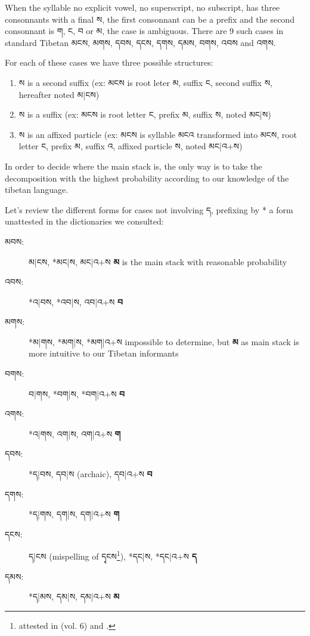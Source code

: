 \documentclass[%
a4paper,%
pagesize,%
12pt,%
parskip=off,%
bibliography=totoc,%
numbers=noenddot,%
DIV=12,%
twoside=semi,%
headings=normal%
]{scrartcl}
\begin{document}
When the syllable no explicit vowel, no superscript, no subscript, has three consonnants with a final ས, the first consonnant can be a prefix and the second consonnant is ག, ང, བ or མ, the case is ambiguous. There are 9 such cases in standard Tibetan མངས, མགས, དབས, དངས, དགས, དམས, བགས, འབས and འགས.

For each of these cases we have three possible structures:
\begin{enumerate}
\item ས is a second suffix (ex: མངས is root leter མ, suffix ང, second suffix ས, hereafter noted མ|ངས)
\item ས is a suffix (ex: མངས is root letter ང, prefix མ, suffix ས, noted མང|ས)
\item ས is an affixed particle (ex: མངས is syllable མངའ transformed into མངས, root letter ང, prefix མ, suffix འ, affixed particle ས, noted མང|འ+ས)
\end{enumerate}

In order to decide where the main stack is, the only way is to take the decomposition with the highest probability according to our knowledge of the tibetan language.

Let's review the different forms for cases not involving ད, prefixing by * a form unattested in the dictionaries we consulted:

\begin{description}
\item[མབས:] མ|ངས, *མང|ས, མང|འ+ས \rightarrow{} \textbf{མ} is the main stack with reasonable probability
\item[འབས:] *འ|བས, *འབ|ས, འབ|འ+ས \rightarrow{} \textbf{བ}
\item[མགས:] *མ|གས, *མག|ས, *མག|འ+ས \rightarrow{} impossible to determine, but \textbf{མ} as main stack is more intuitive to our Tibetan informants
\item[བགས:] བ|གས, *བག|ས, *བག|འ+ས \rightarrow{} \textbf{བ}
\item[འགས:] *འ|གས, འག|ས, འག|འ+ས \rightarrow{} \textbf{ག}
\item[དབས:] *ད|བས, དབ|ས (archaic), དབ|འ+ས \rightarrow{} \textbf{བ}
\item[དགས:] *ད|གས, དག|ས, དག|འ+ས \rightarrow{} \textbf{ག}
\item[དངས:] ད|ངས (mispelling of དྭངས\footnote{attested in \cite{NegiDict} (vol. 6) and \cite{Illuminator}.}), *དང|ས, *དང|འ+ས \rightarrow{} \textbf{ད}
\item[དམས:] *ད|མས, དམ|ས, དམ|འ+ས \rightarrow{} \textbf{མ}
\end{description}
\end{document}
